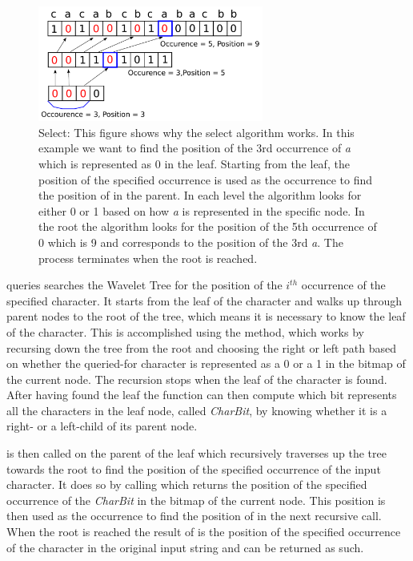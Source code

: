 \begin{figure}
\center \includegraphics[width=0.66\textwidth]{SelectDrawing}
\caption{Select: This figure shows why the select algorithm works. 
In this example we want to find the position of the 3rd occurrence of \textit{a} which is represented as 0 in the leaf.
Starting from the leaf, the position of the specified occurrence is used as the occurrence to find the position of in the parent. 
In each level the algorithm looks for either 0 or 1 based on how \textit{a} is represented in the specific node.
In the root the algorithm looks for the position of the 5th occurrence of 0 which is 9 and corresponds to the position of the 3rd \textit{a}.
The process terminates when the root is reached.}
\label{fig:SelectDrawing}
\end{figure}

 queries searches the Wavelet Tree for the position of the $i^{th}$ occurrence of the specified character.
It starts from the leaf of the character and walks up through parent nodes to the root of the tree, which means it is necessary to know the leaf of the character. 
This is accomplished using the  method, which works by recursing down the tree from the root and choosing the right or left path based on whether the queried-for character is represented as a 0 or a 1 in the bitmap of the current node.
The recursion stops when the leaf of the character is found.
After having found the leaf the  function can then compute which bit represents all the characters in the leaf node, called \textit{CharBit}, by knowing whether it is a right- or a left-child of its parent node.

 is then called on the parent of the leaf which recursively traverses up the tree towards the root to find the position of the specified occurrence of the input character.
It does so by calling  which returns the position of the specified occurrence of the \textit{CharBit} in the bitmap of the current node. 
This position is then used as the occurrence to find the position of in the next recursive call.
When the root is reached the result of  is the position of the specified occurrence of the character in the original input string and can be returned as such.

